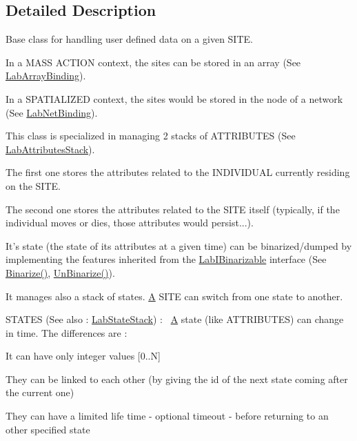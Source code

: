 \subsection{Detailed Description}
Base class for handling user defined data on a given S\+I\+T\+E.~\newline

\begin{DoxyItemize}
\item In a M\+A\+S\+S A\+C\+T\+I\+O\+N context, the sites can be stored in an array (See \hyperlink{classelps_1_1_lab_array_binding}{Lab\+Array\+Binding}).~\newline

\item In a S\+P\+A\+T\+I\+A\+L\+I\+Z\+E\+D context, the sites would be stored in the node of a network (See \hyperlink{classelps_1_1_lab_net_binding}{Lab\+Net\+Binding}).~\newline

\end{DoxyItemize}

This class is specialized in managing 2 stacks of A\+T\+T\+R\+I\+B\+U\+T\+E\+S (See \hyperlink{classelps_1_1_lab_attributes_stack}{Lab\+Attributes\+Stack}).
\begin{DoxyItemize}
\item The first one stores the attributes related to the I\+N\+D\+I\+V\+I\+D\+U\+A\+L currently residing on the S\+I\+T\+E.~\newline

\item The second one stores the attributes related to the S\+I\+T\+E itself (typically, if the individual moves or dies, those attributes would persist...).
\end{DoxyItemize}

It's state (the state of its attributes at a given time) can be binarized/dumped by implementing the features inherited from the \hyperlink{classelps_1_1_lab_i_binarizable}{Lab\+I\+Binarizable} interface (See \hyperlink{classelps_1_1_lab_site_base_a42e30841600ed1e45dcd2c1c2a3071e8}{Binarize()}, \hyperlink{classelps_1_1_lab_site_base_ad1b2721336db27de86213769b78d3ccd}{Un\+Binarize()}).

It manages also a stack of states. \hyperlink{class_a}{A} S\+I\+T\+E can switch from one state to another.

S\+T\+A\+T\+E\+S (See also \+: \hyperlink{classelps_1_1_lab_state_stack}{Lab\+State\+Stack}) \+:~\newline
 \hyperlink{class_a}{A} state (like A\+T\+T\+R\+I\+B\+U\+T\+E\+S) can change in time. The differences are \+:
\begin{DoxyItemize}
\item It can have only integer values \mbox{[}0..N\mbox{]}
\item They can be linked to each other (by giving the id of the next state coming after the current one)
\item They can have a limited life time -\/ optional timeout -\/ before returning to an other specified state
\end{DoxyItemize}

